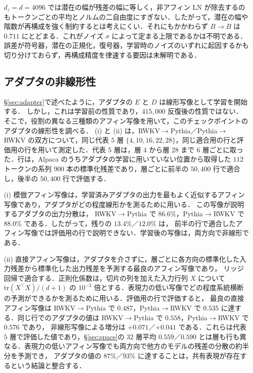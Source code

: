 \documentclass[techrep,noauthor]{ipsj}
\newcommand{\kw}[1]{#1}
\newcommand{\RtoP}{RWKV$\to$\allowbreak Pythia}
\newcommand{\PtoR}{Pythia$\to$\allowbreak RWKV}
\begin{document}
$d_z{=}d{=}4096$ では潜在の幅が残差の幅に等しく，非アフィン LN が除去するのもトークンごとの平均とノルムの二自由度にすぎない．したがって，潜在の幅や階数が再構成を強く制約するとは考えにくい．それにもかかわらず $B\!\to\!B$ は $0.711$ にとどまる．これがノイズ $\sigma$ によって定まる上限であるかは不明である．誤差が符号器，潜在の正規化，復号器，学習時のノイズのいずれに起因するかも切り分けておらず，再構成精度を律速する要因は未解明である．

\subsection{アダプタの非線形性}\label{sec:linear}
\S\ref{sec:adapter}で述べたように，アダプタの $E$ と $D$ は線形写像として学習を開始する．
しかし，これは学習前の性質であり，$415{,}000$ 反復後の性質ではない．そこで，役割の異なる三種類のアフィン写像を用いて，このチェックポイントのアダプタの線形性を調べる．
(i) と (ii) は，\RtoP{}／\PtoR{} の双方について，同じ代表 $5$ 層 $\{4,10,16,22,28\}$，同じ適合用の行と評価用の行を用いて測定した．代表 $5$ 層は，層 $4$ から層 $28$ まで $6$ 層ごとに取った．行は，Alpaca のうちアダプタの学習に用いていない位置から取得した $112$ トークンの系列 $900$ 本の標準化残差であり，層ごとに前半の $50{,}400$ 行で適合し，後半の $50{,}400$ 行で評価する．

(i) 模倣アフィン写像は，学習済みアダプタの出力を最もよく近似するアフィン写像であり，アダプタがどの程度線形かを測るために用いる．
この写像が説明するアダプタの出力分散は，
\RtoP{} で $86.6\%$，\PtoR{} で $88.0\%$ である．したがって，\kw{残りの $13.4\%$／$12.0\%$ は，
前半の行で適合したアフィン写像では評価用の行で説明できない}．学習後の写像は，両方向で非線形である．

(ii) 直接アフィン写像は，アダプタを介さずに，層ごとに各方向の標準化した入力残差から標準化した出力残差を予測する最良のアフィン写像であり，
リッジ回帰で適合する．正則化係数は，切片の列を加えた入力行列 $X$ について $\mathrm{tr}(X^{\top}X)/(d{+}1)$ の $10^{-3}$ 倍とする．表現力の低い写像でどの程度系統横断の予測ができるかを測るために用いる．評価用の行で評価すると，
最良の直接アフィン写像は \RtoP{} で $0.487$，\PtoR{} で $0.535$ に達する．同じ行でのアダプタの値は \RtoP{} で $0.558$，\PtoR{} で $0.576$ であり，
非線形写像による増分は $+0.071$／$+0.041$ である．これらは代表 $5$ 層で評価した値であり，\S\ref{sec:space}の $32$ 層平均 $0.559$／$0.590$ とは層も行も異なる．表現力の低いアフィン写像でも両方向で他方のモデルの残差の分散の約半分を予測でき，
アダプタの値の $87\%$／$93\%$ に達することは，共有表現が存在するという結論と整合する．
\end{document}
